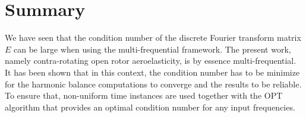 \section*{Summary}

We have seen that the condition number of the
discrete Fourier transform matrix $E$ can be large
when using the multi-frequential framework. The present work,
namely contra-rotating open rotor aeroelasticity, is
by essence multi-frequential. It has been shown that in this context,
the condition number has to be minimize for the harmonic balance
computations to converge and the results to be reliable. 
To ensure that, non-uniform time instances
are used together with the OPT algorithm that provides an
optimal condition number for any input frequencies.
